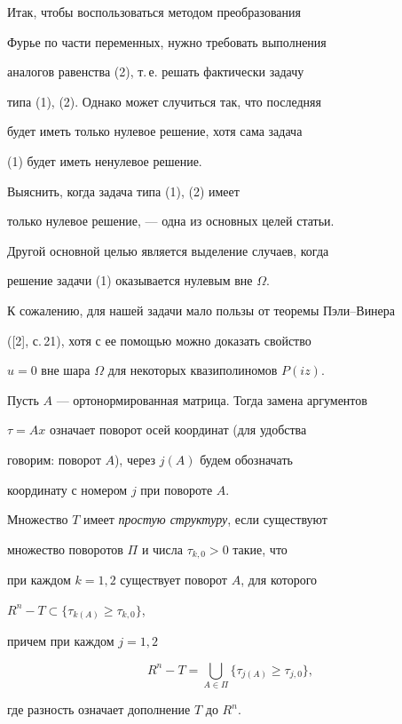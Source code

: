 Итак, чтобы воспользоваться методом преобразования


Фурье по части переменных, нужно требовать выполнения


аналогов равенства (2), т.\,е. решать фактически задачу


типа (1), (2). Однако может случиться так, что последняя


будет иметь только нулевое решение, хотя сама задача


(1) будет иметь ненулевое решение. 





Выяснить, когда задача типа (1), (2) имеет


только нулевое решение, --- одна из основных целей статьи.





Другой основной целью является выделение случаев, когда


решение задачи (1) оказывается нулевым вне $\Omega$.





К сожалению, для нашей задачи мало пользы от теоремы Пэли--Винера


([2], с.\,21), хотя с ее помощью можно доказать свойство


$u=0$ вне шара $\Omega$ для некоторых квазиполиномов $P(iz)$.





Пусть $A$ --- ортонормированная матрица. Тогда замена аргументов


$ \tau =Ax $ означает поворот осей координат (для удобства


говорим: поворот $A$), через $j(A)$ будем обозначать


координату с номером $j$ при повороте $A. $





\begin{defn}


Множество $T$ имеет {\it простую структуру}, если существуют


множество поворотов $\Pi$ и числа $\tau_{k, 0}>0$ такие, что


при каждом $k=1, 2$ существует поворот $A$, для которого


$ R^{n} -T \subset \{ \tau_{k(A)} \ge \tau_{k, 0} \}$,


причем при каждом $j=1, 2$


\begin{equation}


R^{n} - T = \bigcup_{A \in \Pi} \{ \tau_{j(A)} \ge \tau_{j, 0} \},


\end{equation}


где разность означает дополнение $T$ до $R^{n}$.


\end{defn}





